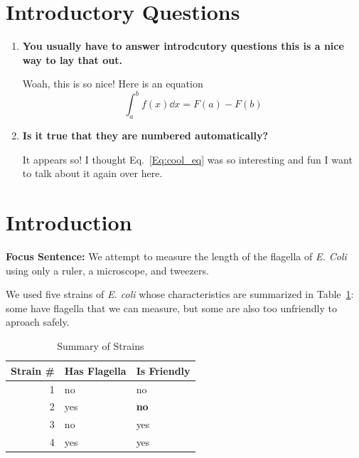 \documentclass{lab}
\begin{document}
\maketitle

\section{Introductory Questions}
\label{Sec:Intro_Questions}

\begin{enumerate}

\item \textbf{You usually have to answer introdcutory questions this is
    a nice way to lay that out.}

  Woah, this is so nice! Here is an equation
  \begin{equation}
    \int_a^b f(x) \dd{x} = F(a) - F(b)
    \label{Eq:cool_eq}
  \end{equation}

\item \textbf{Is it true that they are numbered automatically?}

  It appears so! I thought Eq.~\eqref{Eq:cool_eq} was so interesting and
  fun I want to talk about it again over here.

\end{enumerate}

\section{Introduction}
\label{Sec:Intro}

\textbf{Focus Sentence: } We attempt to measure the length of the
flagella of \textit{E. Coli} using only a ruler, a microscope, and
tweezers.

We used five strains of \textit{E. coli} whose characteristics are
summarized in Table~\ref{table:strains}: some have flagella that we can
measure, but some are also too unfriendly to aproach safely.

\begin{table}[h]
  \centering
  \begin{tabular}{rll}
    \toprule
    Strain \# & Has Flagella & Is Friendly \\
    \midrule
    1         & no           & no \\
    2         & yes          & \textbf{no} \\
    3         & no           & yes \\
    4         & yes          & yes \\
    \bottomrule
  \end{tabular}
  \caption{Summary of Strains}\label{table:strains}
\end{table}
\end{document}
